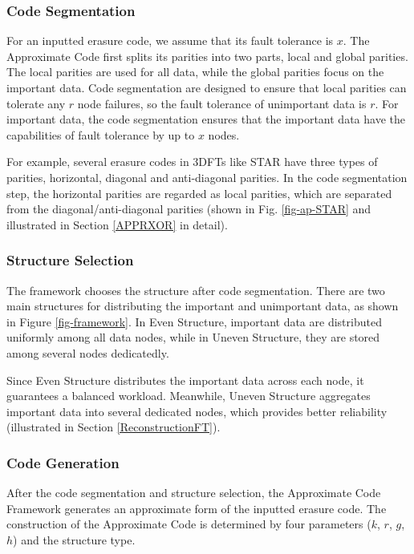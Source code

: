 \documentclass[sigconf]{acmart}
\begin{document}
\subsubsection{Code Segmentation}
For an inputted erasure code, we assume that its fault tolerance is $x$. The Approximate Code first splits its parities into two parts, local and global parities. The local parities are used for all data, while the global parities focus on the important data. Code segmentation are designed to ensure that local parities can tolerate any $r$ node failures, so the fault tolerance of unimportant data is $r$. For important data, the code segmentation ensures that the important data have the capabilities of fault tolerance by up to $x$ nodes.

For example, several erasure codes in 3DFTs like STAR have three types of parities, horizontal, diagonal and anti-diagonal parities. In the code segmentation step, the horizontal parities are regarded as local parities, which are separated from the diagonal/anti-diagonal parities (shown in Fig. \ref{fig-ap-STAR} and illustrated in Section \ref{APPRXOR} in detail).

\subsubsection{Structure Selection}
The framework chooses the structure after code segmentation.
There are two main structures for distributing the important and unimportant data, as shown in Figure \ref{fig-framework}. In Even Structure, important data are distributed uniformly among all data nodes, while in Uneven Structure, they are stored among several nodes dedicatedly.

Since Even Structure distributes the important data across each node, it guarantees a balanced workload. Meanwhile, Uneven Structure aggregates important data into several dedicated nodes, which provides better reliability (illustrated in Section \ref{ReconstructionFT}).

\subsubsection{Code Generation}\label{code-gen}
After the code segmentation and structure selection, the Approximate Code Framework generates an approximate form of the inputted erasure code.
The construction of the Approximate Code is determined by four parameters ($k$, $r$, $g$, $h$) and the structure type.
\end{document}
